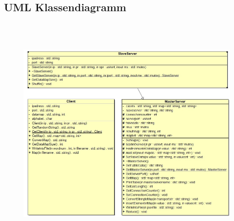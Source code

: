 \documentclass[a4paper,12pt]{article}
\begin{document}
\subsection{UML Klassendiagramm}
\:
\:
\begin{figure}[h]
    \centering
    \includegraphics[width=12cm, height=12cm]{uml.jpeg}
\end{figure}
\newpage
\end{document}
